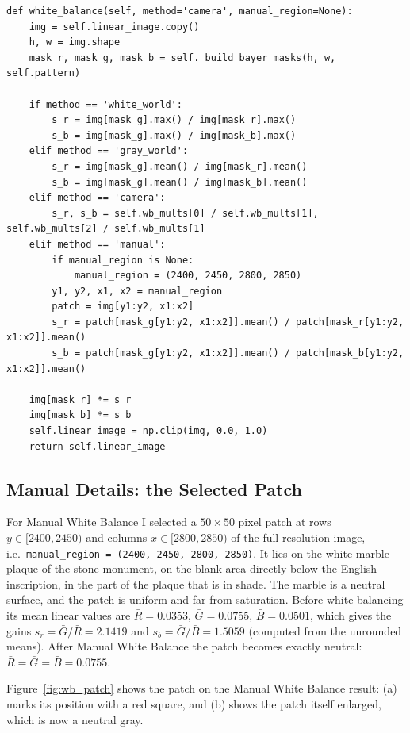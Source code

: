 \documentclass[a4paper]{article}
\begin{document}
\begin{lstlisting}
def white_balance(self, method='camera', manual_region=None):
    img = self.linear_image.copy()
    h, w = img.shape
    mask_r, mask_g, mask_b = self._build_bayer_masks(h, w, self.pattern)

    if method == 'white_world':
        s_r = img[mask_g].max() / img[mask_r].max()
        s_b = img[mask_g].max() / img[mask_b].max()
    elif method == 'gray_world':
        s_r = img[mask_g].mean() / img[mask_r].mean()
        s_b = img[mask_g].mean() / img[mask_b].mean()
    elif method == 'camera':
        s_r, s_b = self.wb_mults[0] / self.wb_mults[1], self.wb_mults[2] / self.wb_mults[1]
    elif method == 'manual':
        if manual_region is None:
            manual_region = (2400, 2450, 2800, 2850)
        y1, y2, x1, x2 = manual_region
        patch = img[y1:y2, x1:x2]
        s_r = patch[mask_g[y1:y2, x1:x2]].mean() / patch[mask_r[y1:y2, x1:x2]].mean()
        s_b = patch[mask_g[y1:y2, x1:x2]].mean() / patch[mask_b[y1:y2, x1:x2]].mean()

    img[mask_r] *= s_r
    img[mask_b] *= s_b
    self.linear_image = np.clip(img, 0.0, 1.0)
    return self.linear_image
\end{lstlisting}

\subsection{Manual Details: the Selected Patch}
For Manual White Balance I selected a $50 \times 50$ pixel patch at rows $y \in [2400, 2450)$ and columns $x \in [2800, 2850)$ of the full-resolution image, i.e.\ \texttt{manual\_region = (2400, 2450, 2800, 2850)}. It lies on the white marble plaque of the stone monument, on the blank area directly below the English inscription, in the part of the plaque that is in shade. The marble is a neutral surface, and the patch is uniform and far from saturation. Before white balancing its mean linear values are $\bar{R} = 0.0353$, $\bar{G} = 0.0755$, $\bar{B} = 0.0501$, which gives the gains $s_r = \bar{G} / \bar{R} = 2.1419$ and $s_b = \bar{G} / \bar{B} = 1.5059$ (computed from the unrounded means). After Manual White Balance the patch becomes exactly neutral: $\bar{R} = \bar{G} = \bar{B} = 0.0755$.

Figure~\ref{fig:wb_patch} shows the patch on the Manual White Balance result: (a) marks its position with a red square, and (b) shows the patch itself enlarged, which is now a neutral gray.
\end{document}
